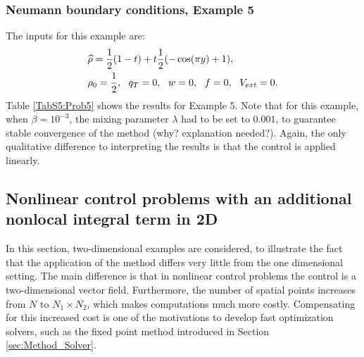 \subsubsection{Neumann boundary conditions, Example 5}
The inputs for this example are:
\begin{align*}
&\widehat \rho = \frac{1}{2}(1-t) + t\frac{1}{2}(-\cos(\pi y) + 1),\\
&\rho_{0} = \frac{1}{2},\ \
q_{T} = 0,\ \
{w} = 0,\ \
f =0,\ \
V_{ext} =0.
\end{align*}
Table \ref{TabS5:Prob5} shows the results for Example 5. Note that for this example, when $\beta = 10^{-3}$, the mixing parameter $\lambda$ had to be set to $0.001$, to guarantee stable convergence of the method (why? explanation needed?).
Again, the only qualitative difference to interpreting the results is that the control is applied linearly.


\subsection{Nonlinear control problems with an additional nonlocal integral term in 2D}
In this section, two-dimensional examples are considered, to illustrate the fact that the application of the method differs very little from the one dimensional setting. The main difference is that in nonlinear control problems the control is a two-dimensional vector field. Furthermore, the number of spatial points increases from $N$ to $N_1\times N_2$, which makes computations much more costly. Compensating for this increased cost is one of the motivations to develop fast optimization solvers, such as the fixed point method introduced in Section \ref{sec:Method_Solver}.
